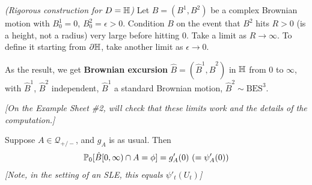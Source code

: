 \documentclass[12pt,a4paper]{article}
\begin{document}
 \emph{(Rigorous construction for $D= \mathbb{H}$)} Let $B= (B^1, B^2)$ be a complex Brownian motion with $B^1_0 =0$, $B^2_0 =\epsilon >0$. Condition $B$ on the event that $B^2$ hits $R>0$ (is a height, not a radius) very large before hitting 0. Take a limit as $R\rightarrow \infty$. To define it starting from $\partial \mathbb{H}$, take another limit as $\epsilon \rightarrow 0$.

\quad As the result, we get \textbf{Brownian excursion} $\hat{B} = (\hat{B}^1, \hat{B}^2)$ in $\mathbb{H}$ from $0$ to $\infty$, with $\hat{B}^1$, $\hat{B}^2$ independent, $\hat{B}^1$ a standard Brownian motion, $\hat{B}^2 \sim \text{BES}^3$.

\emph{[On the Example Sheet \#2, will check that these limits work and the details of the computation.]}
\s

\prop Suppose $A\in \mathscr{Q}_{+/-}$, and $g_A$ is as usual. Then
\begin{align*}
\mathbb{P}_0 [\hat{B}[0, \infty) \cap A = \phi] = g'_A(0) \,\, (=\psi'_A(0))
\end{align*}
\emph{[Note, in the setting of an SLE, this equals $\psi'_t(U_t)$]}
\end{document}
